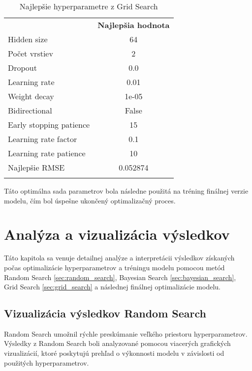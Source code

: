 \begin{table}[ht!]
\centering
\caption{Najlepšie hyperparametre z Grid Search}\label{t:best_grid_search}
\medskip
\small
\begin{tabular}{||l||c||}
\hhline{|t:==:t|}
\multicolumn{1}{||c||}{\textbf{Hyperparameter}} & \multicolumn{1}{c||}{\textbf{Najlepšia hodnota}} \\
\hhline{|:==:|}
Hidden size & 64 \\
\hline
Počet vrstiev & 2 \\
\hline
Dropout & 0.0 \\
\hline
Learning rate & 0.01 \\
\hline
Weight decay & 1e-05 \\
\hline
Bidirectional & False \\
\hline
Early stopping patience & 15 \\
\hline
Learning rate factor & 0.1 \\
\hline
Learning rate patience & 10 \\
\hline
Najlepšie RMSE & 0.052874 \\
\hhline{|b:==:b|}
\end{tabular}
\end{table}

Táto optimálna sada parametrov bola následne použitá na tréning finálnej verzie modelu, čím bol úspešne ukončený optimalizačný proces.

\section{Analýza a vizualizácia výsledkov}

Táto kapitola sa venuje detailnej analýze a interpretácii výsledkov získaných počas optimalizácie hyperparametrov a tréningu modelu pomocou metód Random Search \ref{sec:random_search}, Bayesian Search \ref{sec:bayesian_search}, Grid Search \ref{sec:grid_search} a následnej finálnej optimalizácie modelu.

\subsection{Vizualizácia výsledkov Random Search}

Random Search umožnil rýchle preskúmanie veľkého priestoru hyperparametrov. Výsledky z Random Search boli analyzované pomocou viacerých grafických vizualizácií, ktoré poskytujú prehľad o výkonnosti modelu v závislosti od použitých hyperparametrov.

